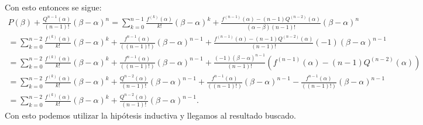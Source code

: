\documentclass{report}
\begin{document}
\begin{itemize}
  Con esto entonces se sigue:
  \begin{align*}
    P\left( \beta \right) + \frac{Q^{n - 1}\left( \alpha \right) }{\left( n - 1 \right)!}\left( \beta - \alpha \right)^{n} = \sum_{k = 0}^{n - 1} \frac{f^{\left( k \right) }\left( \alpha \right) }{k!}\left( \beta - \alpha \right)^{k} +\frac{f^{\left( n - 1 \right) }\left( \alpha \right) - \left( n - 1 \right) Q^{\left( n - 2 \right) }\left( \alpha \right) }{(\alpha - \beta) \left( n - 1 \right)!}\left( \beta - \alpha \right)^{n}   \\
    = \sum_{k = 0}^{n - 2} \frac{f^{\left( k \right) }\left( \alpha \right) }{k!}\left( \beta - \alpha \right)^{k} + \frac{f^{n - 1}\left( \alpha \right) }{\left(\left( n - 1 \right) ! \right) }\left( \beta - \alpha \right)^{n - 1} + \frac{f^{\left( n - 1 \right) }\left( \alpha \right) - \left( n - 1 \right) Q^{\left( n - 2 \right) }\left( \alpha \right) }{\left( n - 1 \right)!}\left( - 1 \right) \left( \beta - \alpha \right)^{n - 1}   \\
    = \sum_{k = 0}^{n - 2} \frac{f^{\left( k \right) }\left( \alpha \right) }{k!}\left( \beta - \alpha \right)^{k} + \frac{f^{n - 1}\left( \alpha \right) }{\left(\left( n - 1 \right) ! \right) }\left( \beta - \alpha \right)^{n - 1} + \frac{\left( - 1 \right) \left( \beta - \alpha \right)^{n - 1} }{\left( n - 1 \right)!}\left(f^{\left( n - 1 \right) }\left( \alpha \right) - \left( n - 1 \right) Q^{\left( n - 2 \right) }\left( \alpha \right)\right)   \\
    = \sum_{k = 0}^{n - 2} \frac{f^{\left( k \right) }\left( \alpha \right) }{k!}\left( \beta - \alpha \right)^{k} + \frac{Q^{n - 2}\left( \alpha \right) }{\left( n - 1 \right) !}\left( \beta - \alpha \right)^{n - 1} + \frac{f^{n - 1}\left( \alpha \right) }{\left(\left( n - 1 \right) ! \right) }\left( \beta - \alpha \right)^{n - 1} - \frac{f^{n - 1}\left( \alpha \right) }{\left(\left( n - 1 \right) ! \right) }\left( \beta - \alpha \right)^{n - 1}\\
    = \sum_{k = 0}^{n - 2} \frac{f^{\left( k \right) }\left( \alpha \right) }{k!}\left( \beta - \alpha \right)^{k} + \frac{Q^{n - 2}\left( \alpha \right) }{\left( n - 1 \right) !}\left( \beta - \alpha \right)^{n - 1}
  .\end{align*}
  Con esto podemos utilizar la hipótesis inductiva y llegamos al resultado buscado.
\end{itemize}
\end{document}
